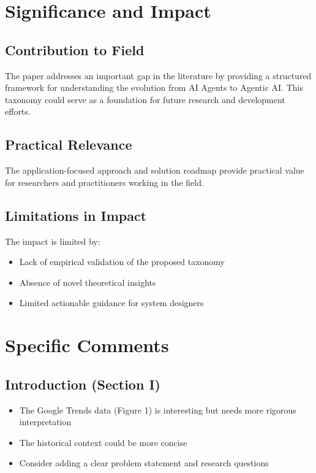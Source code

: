 \documentclass[12pt]{article}
\begin{document}
{\section{Significance and Impact}

\subsection{Contribution to Field}
The paper addresses an important gap in the literature by providing a structured framework for understanding the evolution from AI Agents to Agentic AI. This taxonomy could serve as a foundation for future research and development efforts.

\subsection{Practical Relevance}
The application-focused approach and solution roadmap provide practical value for researchers and practitioners working in the field.

\subsection{Limitations in Impact}
The impact is limited by:

\begin{itemize}
\item Lack of empirical validation of the proposed taxonomy
\item Absence of novel theoretical insights
\item Limited actionable guidance for system designers
\end{itemize}

\section{Specific Comments}

\subsection{Introduction (Section I)}
\begin{itemize}
\item The Google Trends data (Figure 1) is interesting but needs more rigorous interpretation
\item The historical context could be more concise
\item Consider adding a clear problem statement and research questions
\end{itemize}

}
\end{document}
